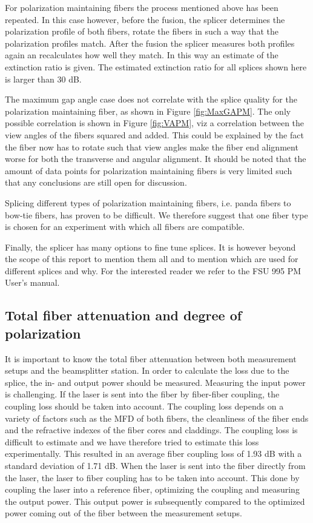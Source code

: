 
For polarization maintaining fibers the process mentioned above has been repeated. In this case however, before the fusion, the splicer determines the polarization profile of both fibers, rotate the fibers in such a way that the polarization profiles match. After the fusion the splicer measures both profiles again an recalculates how well they match. In this way an estimate of the extinction ratio is given. The estimated extinction ratio for all splices shown here is larger than 30 dB.  

The maximum gap angle case does not correlate with the splice quality for the polarization maintaining fiber, as shown in Figure \ref{fig:MaxGAPM}. The only possible correlation is shown in Figure \ref{fig:VAPM}, viz a correlation between the view angles of the fibers squared and added. This could be explained by the fact the fiber now has to rotate such that view angles make the fiber end alignment worse for both the transverse and angular alignment. It should be noted that the amount of data points for polarization maintaining fibers is very limited such that any conclusions are still open for discussion.

Splicing different types of polarization maintaining fibers, i.e. panda fibers to bow-tie fibers, has proven to be difficult. We therefore suggest that one fiber type is chosen for an experiment with which all fibers are compatible. 

Finally, the splicer has many options to fine tune splices. It is however beyond the scope of this report to mention them all and to mention which are used for different splices and why. For the interested reader we refer to the FSU 995 PM User's manual. 

\color{tudelft-cyan}
\subsection{Total fiber attenuation and degree of polarization}
\color{black}
It is important to know the total fiber attenuation between both measurement setups and the beamsplitter station.  In order to calculate the loss due to the splice, the in- and output power should be measured. Measuring the input power is challenging. If the laser is sent into the fiber by fiber-fiber coupling, the coupling loss should be taken into account. The coupling loss depends on a variety of factors such as the MFD of both fibers, the cleanliness of the fiber ends and the refractive indexes of the fiber cores and claddings. The coupling loss is difficult to estimate and we have therefore tried to estimate this loss experimentally. This resulted in an average fiber coupling loss of 1.93 dB with a standard deviation of 1.71 dB. When the laser is sent into the fiber directly from the laser, the laser to fiber coupling has to be taken into account. This done by coupling the laser into a reference fiber, optimizing the coupling and measuring the output power. This output power is subsequently compared to the optimized power coming out of the fiber between the measurement setups. 

